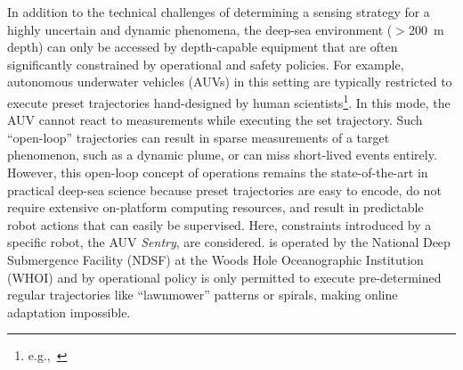 In addition to the technical challenges of determining a sensing strategy for a highly uncertain and dynamic phenomena, the deep-sea environment ($>$\SI{200}{\meter} depth) can only be accessed by depth-capable equipment that are often significantly constrained by operational and safety policies. For example, autonomous underwater vehicles (AUVs) in this setting are typically restricted to execute preset trajectories hand-designed by human scientists\footnote{e.g.,~\cite{camilli2010tracking}}. In this mode, the AUV cannot react to measurements while executing the set trajectory. Such ``open-loop'' trajectories can result in sparse measurements of a target phenomenon, such as a dynamic plume, or can miss short-lived events entirely\autocite{flaspohler2019information, preston2019adaptive}. However, this open-loop concept of operations remains the state-of-the-art in practical deep-sea science because preset trajectories are easy to encode, do not require extensive on-platform computing resources, and result in predictable robot actions that can easily be supervised. Here, constraints introduced by a specific robot, the AUV \emph{Sentry}, are considered. \Sentry is operated by the National Deep Submergence Facility (NDSF) at the Woods Hole Oceanographic Institution (WHOI)\autocite{kaiser2016design} and by operational policy is only permitted to execute pre-determined regular trajectories like ``lawnmower'' patterns or spirals, making online adaptation impossible. %

